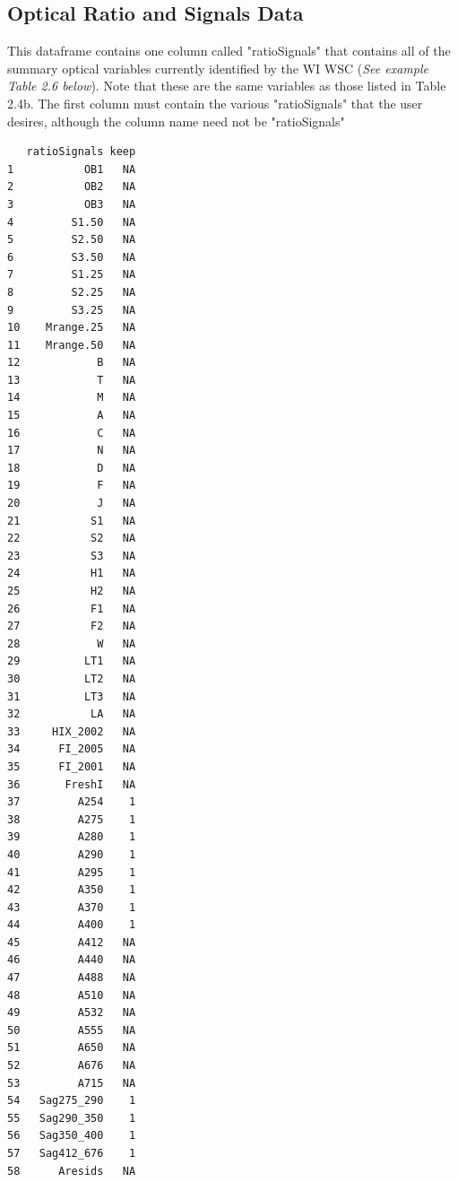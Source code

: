 \documentclass[a4paper,11pt]{article}\usepackage[]{graphicx}\usepackage[]{color}
\makeatletter
\newenvironment{kframe}{%
 \def\at@end@of@kframe{}%
 \ifinner\ifhmode%
  \def\at@end@of@kframe{\end{minipage}}%
  \begin{minipage}{\columnwidth}%
 \fi\fi%
 \def\FrameCommand##1{\hskip\@totalleftmargin \hskip-\fboxsep
 \colorbox{shadecolor}{##1}\hskip-\fboxsep
     \hskip-\linewidth \hskip-\@totalleftmargin \hskip\columnwidth}%
 \MakeFramed {\advance\hsize-\width
   \@totalleftmargin\z@ \linewidth\hsize
   \@setminipage}}%
 {\par\unskip\endMakeFramed%
 \at@end@of@kframe}
\newenvironment{knitrout}{}{} %
\makeatother
\begin{document}
\subsection{Optical Ratio and Signals Data}
This dataframe contains one column called "ratioSignals" that contains all of the summary optical variables currently identified by the WI WSC (\emph{See example Table 2.6 below}). Note that these are the same variables as those listed in Table 2.4b. The first column must contain the various "ratioSignals" that the user desires, although the column name need not be "ratioSignals"

\begin{knitrout}
\color{fgcolor}\begin{kframe}
\begin{verbatim}
   ratioSignals keep
1           OB1   NA
2           OB2   NA
3           OB3   NA
4         S1.50   NA
5         S2.50   NA
6         S3.50   NA
7         S1.25   NA
8         S2.25   NA
9         S3.25   NA
10    Mrange.25   NA
11    Mrange.50   NA
12            B   NA
13            T   NA
14            M   NA
15            A   NA
16            C   NA
17            N   NA
18            D   NA
19            F   NA
20            J   NA
21           S1   NA
22           S2   NA
23           S3   NA
24           H1   NA
25           H2   NA
26           F1   NA
27           F2   NA
28            W   NA
29          LT1   NA
30          LT2   NA
31          LT3   NA
32           LA   NA
33     HIX_2002   NA
34      FI_2005   NA
35      FI_2001   NA
36       FreshI   NA
37         A254    1
38         A275    1
39         A280    1
40         A290    1
41         A295    1
42         A350    1
43         A370    1
44         A400    1
45         A412   NA
46         A440   NA
47         A488   NA
48         A510   NA
49         A532   NA
50         A555   NA
51         A650   NA
52         A676   NA
53         A715   NA
54   Sag275_290    1
55   Sag290_350    1
56   Sag350_400    1
57   Sag412_676    1
58      Aresids   NA
\end{verbatim}
\end{kframe}
\end{knitrout}

\end{document}
